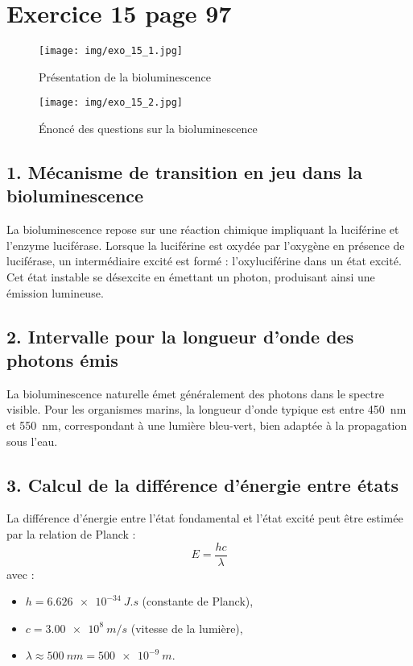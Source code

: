 \documentclass[a4paper,11pt]{article}
\begin{document}
\section*{Exercice 15 page 97}

\begin{figure}[H]
    \centering
    \texttt{[image: img/exo\_15\_1.jpg]}
    \caption{Présentation de la bioluminescence}
    \label{fig:bioluminescence}
\end{figure}

\begin{figure}[H]
    \centering
    \texttt{[image: img/exo\_15\_2.jpg]}
    \caption{Énoncé des questions sur la bioluminescence}
    \label{fig:questions_bioluminescence}
\end{figure}

\subsection*{1. Mécanisme de transition en jeu dans la bioluminescence}
La bioluminescence repose sur une réaction chimique impliquant la luciférine et l'enzyme luciférase. Lorsque la luciférine est oxydée par l'oxygène en présence de luciférase, un intermédiaire excité est formé : l'oxyluciférine dans un état excité. Cet état instable se désexcite en émettant un photon, produisant ainsi une émission lumineuse.

\subsection*{2. Intervalle pour la longueur d’onde des photons émis}
La bioluminescence naturelle émet généralement des photons dans le spectre visible. Pour les organismes marins, la longueur d’onde typique est entre \SI{450}{nm} et \SI{550}{nm}, correspondant à une lumière bleu-vert, bien adaptée à la propagation sous l’eau.

\subsection*{3. Calcul de la différence d’énergie entre états}
La différence d’énergie entre l’état fondamental et l’état excité peut être estimée par la relation de Planck :
\begin{equation}
    E = \frac{hc}{\lambda}
\end{equation}
avec :
\begin{itemize}
    \item \( h = \SI{6.626e-34}{J.s} \) (constante de Planck),
    \item \( c = \SI{3.00e8}{m/s} \) (vitesse de la lumière),
    \item \( \lambda \approx \SI{500}{nm} = \SI{500e-9}{m} \).
\end{itemize}
\end{document}
